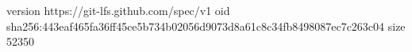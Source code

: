 version https://git-lfs.github.com/spec/v1
oid sha256:443eaf465fa36ff45ce5b734b02056d9073d8a61c8c34fb8498087ec7c263c04
size 52350
